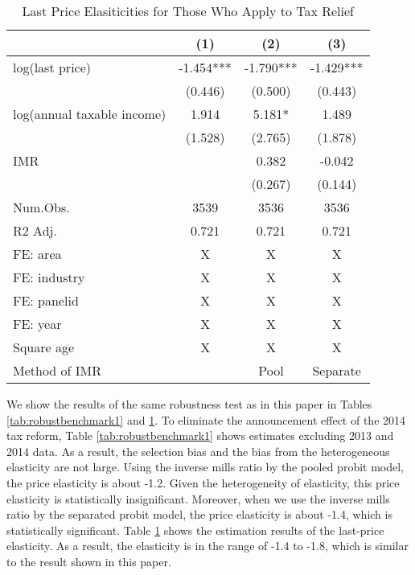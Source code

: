 \documentclass[
  11pt,
  a4paper,
]{article}
\begin{document}
\begin{table}

\caption{\label{tab:robustbenchmark2}Last Price Elasiticities for Those Who Apply to Tax Relief}
\centering
\begin{tabular}[t]{lccc}
\toprule
  & (1) & (2) & (3)\\
\midrule
log(last price) & -1.454*** & -1.790*** & -1.429***\\
 & (0.446) & (0.500) & (0.443)\\
log(annual taxable income) & 1.914 & 5.181* & 1.489\\
 & (1.528) & (2.765) & (1.878)\\
IMR &  & 0.382 & -0.042\\
 &  & (0.267) & (0.144)\\
\midrule
Num.Obs. & 3539 & 3536 & 3536\\
R2 Adj. & 0.721 & 0.721 & 0.721\\
FE: area & X & X & X\\
FE: industry & X & X & X\\
FE: panelid & X & X & X\\
FE: year & X & X & X\\
Square age & X & X & X\\
Method of IMR &  & Pool & Separate\\
\bottomrule
\end{tabular}
\end{table}

We show the results of the same robustness test as in this paper
in Tables \ref{tab:robustbenchmark1} and \ref{tab:robustbenchmark2}.
To eliminate the announcement effect of the 2014 tax reform,
Table \ref{tab:robustbenchmark1} shows
estimates excluding 2013 and 2014 data.
As a result, the selection bias and
the bias from the heterogeneous elasticity are not large.
Using the inverse mills ratio by the pooled probit model,
the price elasticity is about -1.2.
Given the heterogeneity of elasticity,
this price elasticity is statistically insignificant.
Moreover,
when we use the inverse mills ratio by the separated probit model,
the price elasticity is about -1.4, which is statistically significant.
Table \ref{tab:robustbenchmark2} shows
the estimation results of the last-price elasticity.
As a result, the elasticity is in the range of -1.4 to -1.8,
which is similar to the result shown in this paper.
\end{document}
